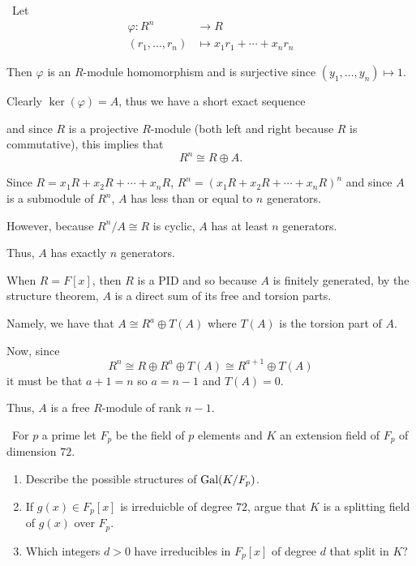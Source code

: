 \documentclass[12pt]{Qual}
\begin{document}
\begin{solution}$\,$
Let \begin{align*}
    \varphi:R^n&\to R\\
    (r_1,...,r_n)&\mapsto x_1r_1+\cdots+x_nr_n
\end{align*}

Then $\varphi$ is an $R$-module homomorphism and is surjective since $(y_1,...,y_n)\mapsto 1$.

Clearly $\ker(\varphi)=A$, thus we have a short exact sequence \begin{center}
\end{center}

and since $R$ is a projective $R$-module (both left and right because $R$ is commutative), this implies that $$R^n\cong R\oplus A.$$

Since $R=x_1R+x_2R+\cdots+x_nR$, $R^n=(x_1R+x_2R+\cdots+x_nR)^n$ and since $A$ is a submodule of $R^n$, $A$ has less than or equal to $n$ generators.

However, because $R^n/A\cong R$ is cyclic, $A$ has at least $n$ generators.

Thus, $A$ has exactly $n$ generators.

When $R=F[x]$, then $R$ is a PID and so because $A$ is finitely generated, by the structure theorem, $A$ is a direct sum of its free and torsion parts.

Namely, we have that $A\cong R^a\oplus T(A)$ where $T(A)$ is the torsion part of $A$.

Now, since $$R^n\cong R\oplus R^a\oplus T(A)\cong R^{a+1}\oplus T(A)$$ it must be that $a+1=n$ so $a=n-1$ and $T(A)=0$.

Thus, $A$ is a free $R$-module of rank $n-1.$
\end{solution}
\newpage




\begin{problem} $\,$
For $p$ a prime let $F_p$ be the field of $p$ elements and $K$ an extension field of $F_p$ of dimension $72$.
\begin{enumerate}[label=(\alph*)]
    \item Describe the possible structures of $\text{Gal}(K/F_p)$.
    \item If $g(x)\in F_p[x]$ is irreduicble of degree $72$, argue that $K$ is a splitting field of $g(x)$ over $F_p.$
    \item Which integers $d>0$ have irreducibles in $F_p[x]$ of degree $d$ that split in $K?$
\end{enumerate}
\end{problem}
\end{document}
